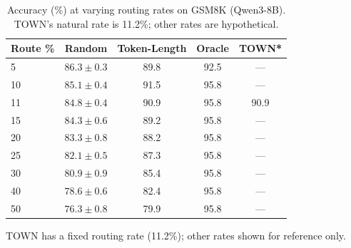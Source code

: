 \begin{table}[t]
\centering
\caption{Accuracy (\%) at varying routing rates on GSM8K (Qwen3-8B). TOWN's natural rate is 11.2\%; other rates are hypothetical.}
\label{tab:routing_sweep}
\small
\begin{tabular}{@{}lcccc@{}}
\toprule
Route \% & Random & Token-Length & Oracle & TOWN* \\
\midrule
5 & $86.3 \pm 0.3$ & 89.8 & 92.5 & --- \\
10 & $85.1 \pm 0.4$ & 91.5 & 95.8 & --- \\
11 & $84.8 \pm 0.4$ & 90.9 & 95.8 & 90.9 \\
15 & $84.3 \pm 0.6$ & 89.2 & 95.8 & --- \\
20 & $83.3 \pm 0.8$ & 88.2 & 95.8 & --- \\
25 & $82.1 \pm 0.5$ & 87.3 & 95.8 & --- \\
30 & $80.9 \pm 0.9$ & 85.4 & 95.8 & --- \\
40 & $78.6 \pm 0.6$ & 82.4 & 95.8 & --- \\
50 & $76.3 \pm 0.8$ & 79.9 & 95.8 & --- \\
\bottomrule
\end{tabular}
\vspace{-0.5em}
\begin{flushleft}
\footnotesize *TOWN has a fixed routing rate (11.2\%); other rates shown for reference only.
\end{flushleft}
\end{table}